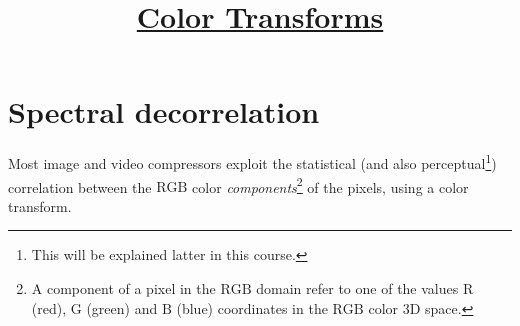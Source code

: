 
%


\title{\href{https://sistemas-multimedia.github.io/contents/color_transforms/}{Color Transforms}}

\maketitle
\tableofcontents

\section{Spectral decorrelation}

Most image and video compressors exploit the statistical (and also
perceptual\footnote{This will be explained latter in this course.})
correlation between the $\text{RGB}$ color
\emph{components}\footnote{A component of a pixel in the $\text{RGB}$
domain refer to one of the values $\text{R}$ (red), $\text{G}$ (green)
and $\text{B}$ (blue) coordinates in the $\text{RGB}$ color 3D space.}
of the pixels, using a color transform.

